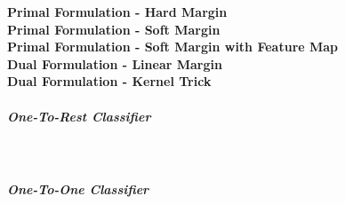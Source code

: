 \documentclass[12pt]{article}
\begin{document}
	\textbf{Primal Formulation - Hard Margin}\\
	\textbf{Primal Formulation - Soft Margin}\\
	\textbf{Primal Formulation - Soft Margin with Feature Map}\\
	\textbf{Dual Formulation - Linear Margin}\\
	\textbf{Dual Formulation - Kernel Trick}\\
	\subparagraph{One-To-Rest Classifier}\mbox{}\\\newline
	\subparagraph{One-To-One Classifier}\mbox{}\\\newline
	
	\printbibliography
\end{document}
